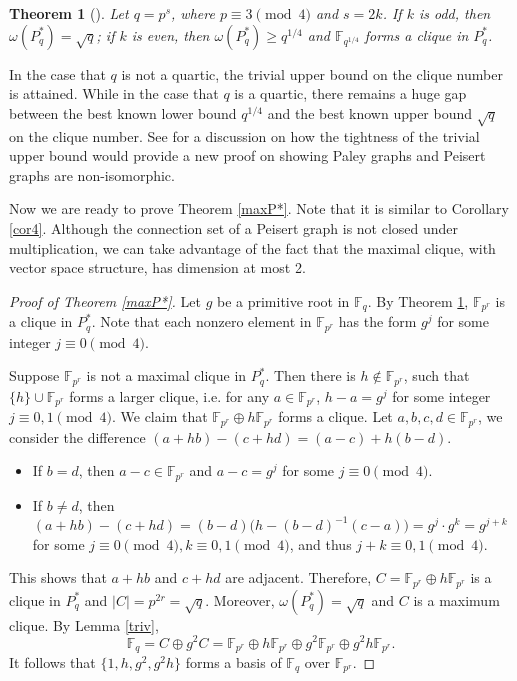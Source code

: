 \documentclass[12pt,oneside]{amsart}
\newtheorem{thm}{Theorem}[section]
\newcommand{\F}{\mathbb{F}}
\begin{document}
\begin{thm}[{\cite[Theorem 5.1]{KP}}] \label{KP}
Let $q=p^s$, where $p \equiv 3 \pmod 4$ and $s=2k$. If $k$ is odd, then $\omega(P^*_q)= \sqrt{q}$; if $k$ is even, then $\omega(P^*_q) \geq q^{1/4}$ and $\F_{q^{1/4}}$ forms a clique in $P^*_q$.
\end{thm}

In the case that $q$ is not a quartic, the trivial upper bound on the clique number is attained. While in the case that $q$ is a quartic, there remains a huge gap between the best known lower bound $q^{1/4}$ and the best known upper bound $\sqrt{q}$ on the clique number. See \cite[Lemma 3.3.6]{NM} for a discussion on how the tightness of the trivial upper bound would provide a new proof on showing Paley graphs and Peisert graphs are non-isomorphic.%

Now we are ready to prove Theorem \ref{maxP*}. Note that it is similar to Corollary \ref{cor4}. Although the connection set of a Peisert graph is not closed under multiplication, we can take advantage of the fact that the maximal clique, with vector space structure, has dimension at most 2.

\begin{proof}[Proof of Theorem \ref{maxP*}]
Let $g$ be a primitive root in $\F_q$. By Theorem \ref{KP}, $\F_{p^r}$ is a clique in $P_q^*$.  Note that each nonzero element in $\F_{p^r}$ has the form $g^{j}$ for some integer $j \equiv 0 \pmod 4$. 

Suppose $\F_{p^r}$ is not a maximal clique in $P^*_q$.
 Then there is $h \notin \F_{p^r}$, such that $\{h\} \cup \F_{p^r}$ forms a larger clique, i.e. for any $a \in \F_{p^r}$, $h-a=g^j$ for some integer $j \equiv 0,1 \pmod 4$. We claim that $\F_{p^r} \oplus h\F_{p^r}$ forms a clique. Let $a,b,c,d \in \F_{p^r}$, we consider the difference
$
(a+hb)-(c+hd)=(a-c)+h(b-d).
$
\begin{itemize}
    \item If $b=d$, then $a-c \in \F_{p^r}$ and $a-c=g^j$ for some $j \equiv 0 \pmod 4$.
    \item If $b \neq d$, then $(a+hb)-(c+hd)=(b-d) \big(h- (b-d)^{-1}(c-a)\big)=g^j \cdot g^k=g^{j+k}$ for some $j \equiv 0 \pmod 4, k \equiv 0,1 \pmod 4$, and thus $j+k \equiv 0,1 \pmod 4$.
\end{itemize}
This shows that $a+hb$ and $c+hd$ are adjacent. Therefore, $C=\F_{p^r} \oplus h\F_{p^r}$ is a clique in $P^*_q$ and $|C|=p^{2r}=\sqrt{q}$. Moreover, $\omega(P^*_q)= \sqrt{q}$ and $C$ is a maximum clique. By Lemma \ref{triv}, $$\F_q=C \oplus g^2C=\F_{p^r} \oplus h\F_{p^r} \oplus g^2\F_{p^r} \oplus g^2h\F_{p^r}.
$$
It follows that $\{1,h,g^2,g^2h\}$ forms a basis of $\F_q$ over $\F_{p^r}$.
\end{proof}
\end{document}
